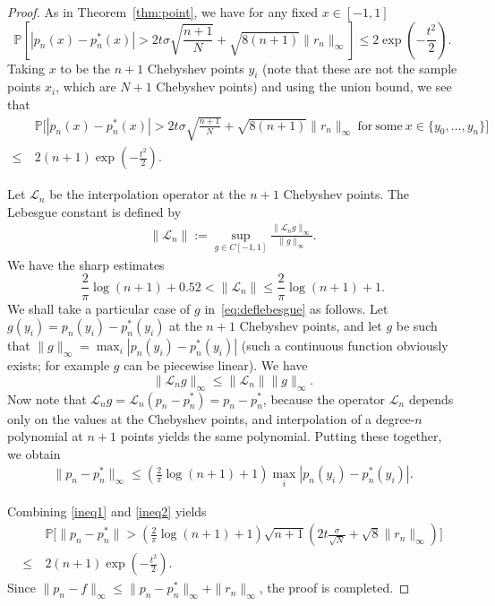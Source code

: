 \documentclass[final,onefignum,onetabnum]{siamart220329}
\begin{document}
\begin{proof}
	As in Theorem~\ref{thm:point}, we have for any fixed $x\in[-1,1]$
	\begin{equation*}
		\mathbb{P} \left[ |p_n(x)-p_n^*(x)|>2 t \sigma \sqrt{\frac{n+1}{N}}+\sqrt{8(n+1)} \|r_n\|_\infty \right]\leq 2 \exp \left( -\frac{t^2}{2} \right).
	\end{equation*}
	Taking $x$ to be the $n+1$ Chebyshev points $y_i$ (note that these are not the sample points $x_i$, which are $N+1$ Chebyshev points) and using  the union bound, we see that 
	\begin{align}
		& \mathbb{P}\bigg[|p_n(x)-p_n^*(x)|>2 t \sigma \sqrt{\frac{n+1}{N}}+\sqrt{8(n+1)} \|r_n\|_\infty \ \mathrm{for\ some\ } x\in\{y_0,\ldots,y_{n} \}\bigg] \nonumber \\
		\leq \ & 2(n+1)\exp \left( -\frac{t^2}{2} \right). \label{ineq1}
	\end{align}
	
	Let $\mathcal{L}_n$ be the interpolation operator at the $n+1$ Chebyshev points. 
	The Lebesgue constant is defined by
	\begin{align}  \label{eq:deflebesgue}
		\|\mathcal{L}_n\|:=\sup_{g\in C[-1,1]}\frac{\|\mathcal{L}_ng\|_\infty}{\|g\|_\infty}.  
	\end{align}
	{We} have the sharp estimates~\cite[Ch.~15]{trefethenatap} 
	\[
	\frac{2}{\pi}\log(n+1)+0.52 < \|\mathcal{L}_n\|\leq \frac{2}{\pi}\log(n+1)+1. 
	\]
	We shall take a particular case of 
	$g$ in~\eqref{eq:deflebesgue} as follows. 
	Let $g(y_i)=p_n(y_i)-p_{n}^*(y_i)$ at the $n+1$ Chebyshev points, and let $g$ be such that $\|g\|_\infty=\max_i|p_n(y_i)-p_n^*(y_i)|$ (such a continuous function obviously exists; for example $g$ can be piecewise linear). 
	We have 
	\[ 
	\|\mathcal{L}_ng\|_\infty\leq \|\mathcal{L}_n\|\|g\|_\infty.  
	\]
	Now note that $\mathcal{L}_ng=\mathcal{L}_n(p_n-p_n^*)=p_n-p_n^*$, because the operator $\mathcal{L}_n$ depends only on the values at the Chebyshev points, and interpolation of a degree-$n$ polynomial at $n+1$ points yields the same polynomial. 
	Putting these together, we obtain  
	\begin{align} 
		\|p_n-p_n^*\|_\infty \leq \left( \frac{2}{\pi}\log(n+1)+1 \right) \max_i |p_n(y_i)-p_n^*(y_i)|.  \label{ineq2}
	\end{align}
	
	Combining \eqref{ineq1} and \eqref{ineq2} yields
	\begin{align*} 
		&\mathbb{P}\bigg[\| p_n-p_n^* \|>\left( \frac{2}{\pi}\log(n+1)+1 \right) \sqrt{n+1} \left( 2t \frac{\sigma}{\sqrt{N}}+\sqrt{8} \|r_n\|_\infty \right) \bigg] \\
		\leq \ & 2(n+1)\exp \left( -\frac{t^2}{2} \right).
	\end{align*}
	Since $\| p_n-f \|_\infty \leq \| p_n-p_n^* \|_\infty+\| r_n \|_\infty$, {the proof is completed}.
\end{proof}
\end{document}
